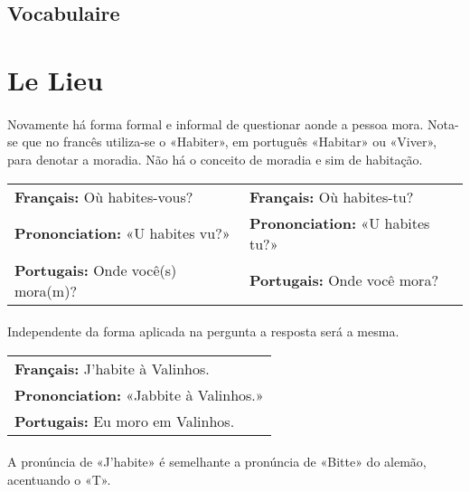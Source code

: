 \documentclass{article}
\begin{document}
    \subsection{Vocabulaire}
\newpage

\section{Le Lieu}
    \paragraph{}Novamente há forma formal e informal de questionar aonde a pessoa mora. Nota-se que no francês utiliza-se o «Habiter», em português «Habitar» ou «Viver», para denotar a moradia. Não há o conceito de moradia e sim de habitação.
       
        \begin{center}
            \begin{tabular}{m{8cm} m{8cm}}
                \textbf{Français:}      Où habites-vous?      & \textbf{Français:}      Où habites-tu?\\
                \textbf{Prononciation:} «U habites vu?»       & \textbf{Prononciation:} «U habites tu?»\\
                \textbf{Portugais:}     Onde você(s) mora(m)? & \textbf{Portugais:}     Onde você mora?\\
            \end{tabular}
        \end{center}

        \paragraph{}Independente da forma aplicada na pergunta a resposta será a mesma.
    
            \begin{center}
                \begin{tabular}{l}
                    \textbf{Français:}      J’habite à Valinhos.\\
                    \textbf{Prononciation:} «Jabbite à Valinhos.»\\
                    \textbf{Portugais:}     Eu moro em Valinhos.\\
                \end{tabular}
            \end{center}

        \paragraph{}A pronúncia de «J’habite» é semelhante a pronúncia de «Bitte» do alemão, acentuando o «T».
    
\end{document}
